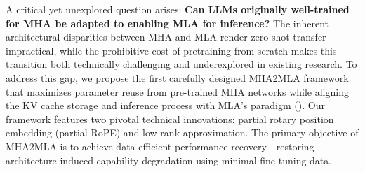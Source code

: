 
A critical yet unexplored question arises: \textbf{Can LLMs originally well-trained for MHA be adapted to enabling MLA for inference?} 
The inherent architectural disparities between MHA and MLA render zero-shot transfer impractical, while the prohibitive cost of pretraining from scratch makes this transition both technically challenging and underexplored in existing research.
To address this gap, we propose the first carefully designed MHA2MLA framework that maximizes parameter reuse from pre-trained MHA networks while aligning the KV cache storage and inference process with MLA's paradigm (). Our framework features two pivotal technical innovations: partial rotary position embedding (partial RoPE) and low-rank approximation.
The primary objective of MHA2MLA is to achieve data-efficient performance recovery - restoring architecture-induced capability degradation using minimal fine-tuning data.


